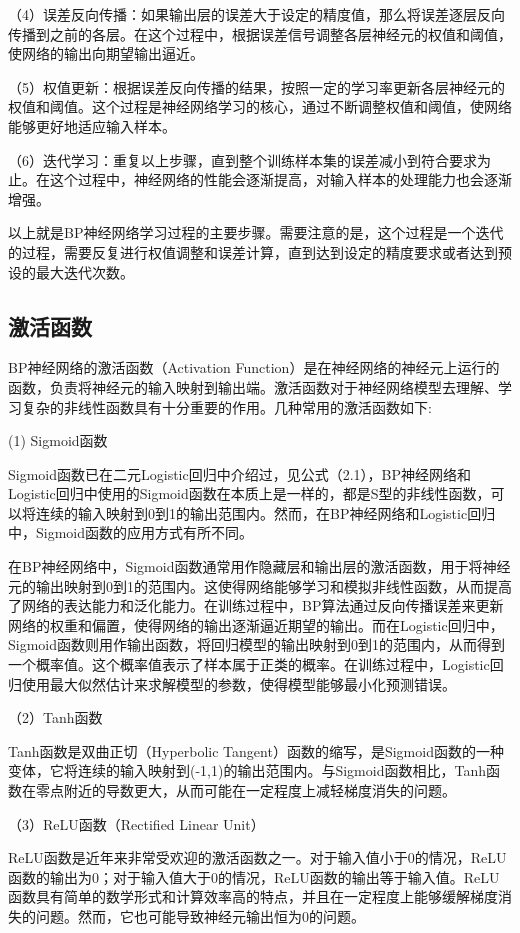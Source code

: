（4）误差反向传播：如果输出层的误差大于设定的精度值，那么将误差逐层反向传播到之前的各层。在这个过程中，根据误差信号调整各层神经元的权值和阈值，使网络的输出向期望输出逼近。

（5）权值更新：根据误差反向传播的结果，按照一定的学习率更新各层神经元的权值和阈值。这个过程是神经网络学习的核心，通过不断调整权值和阈值，使网络能够更好地适应输入样本。

（6）迭代学习：重复以上步骤，直到整个训练样本集的误差减小到符合要求为止。在这个过程中，神经网络的性能会逐渐提高，对输入样本的处理能力也会逐渐增强。

以上就是BP神经网络学习过程的主要步骤。需要注意的是，这个过程是一个迭代的过程，需要反复进行权值调整和误差计算，直到达到设定的精度要求或者达到预设的最大迭代次数。

\subsection{激活函数}
BP神经网络的激活函数（Activation Function）是在神经网络的神经元上运行的函数，负责将神经元的输入映射到输出端。激活函数对于神经网络模型去理解、学习复杂的非线性函数具有十分重要的作用。几种常用的激活函数如下:

(1) Sigmoid函数

Sigmoid函数已在二元Logistic回归中介绍过，见公式（2.1），BP神经网络和Logistic回归中使用的Sigmoid函数在本质上是一样的，都是S型的非线性函数，可以将连续的输入映射到0到1的输出范围内。然而，在BP神经网络和Logistic回归中，Sigmoid函数的应用方式有所不同。

在BP神经网络中，Sigmoid函数通常用作隐藏层和输出层的激活函数，用于将神经元的输出映射到0到1的范围内。这使得网络能够学习和模拟非线性函数，从而提高了网络的表达能力和泛化能力。在训练过程中，BP算法通过反向传播误差来更新网络的权重和偏置，使得网络的输出逐渐逼近期望的输出。而在Logistic回归中，Sigmoid函数则用作输出函数，将回归模型的输出映射到0到1的范围内，从而得到一个概率值。这个概率值表示了样本属于正类的概率。在训练过程中，Logistic回归使用最大似然估计来求解模型的参数，使得模型能够最小化预测错误。

（2）Tanh函数

Tanh函数是双曲正切（Hyperbolic Tangent）函数的缩写，是Sigmoid函数的一种变体，它将连续的输入映射到(-1,1)的输出范围内。与Sigmoid函数相比，Tanh函数在零点附近的导数更大，从而可能在一定程度上减轻梯度消失的问题。

（3）ReLU函数（Rectified Linear Unit）

ReLU函数是近年来非常受欢迎的激活函数之一。对于输入值小于0的情况，ReLU函数的输出为0；对于输入值大于0的情况，ReLU函数的输出等于输入值。ReLU函数具有简单的数学形式和计算效率高的特点，并且在一定程度上能够缓解梯度消失的问题。然而，它也可能导致神经元输出恒为0的问题。

